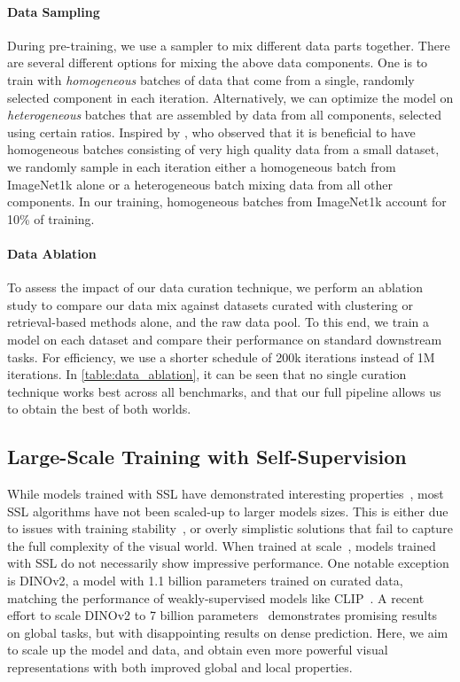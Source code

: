 \paragraph{Data Sampling}
During pre-training, we use a sampler to mix different data parts together.
There are several different options for mixing the above data components.
One is to train with \textit{homogeneous} batches of data that come from a single, randomly selected component in each iteration.
Alternatively, we can optimize the model on \textit{heterogeneous} batches that are assembled by data from all components, selected using certain ratios.
Inspired by \citet{charton2024emergent}, who observed that it is beneficial to have homogeneous batches consisting of very high quality data from a small dataset, we randomly sample in each iteration either a homogeneous batch from ImageNet1k alone or a heterogeneous batch mixing data from all other components.
In our training, homogeneous batches from ImageNet1k account for 10\% of training.

\paragraph{Data Ablation}
To assess the impact of our data curation technique, we perform an ablation study to compare our data mix against datasets curated with clustering or retrieval-based methods alone, and the raw data pool.
To this end, we train a model on each dataset and compare their performance on standard downstream tasks.
For efficiency, we use a shorter schedule of 200k iterations instead of 1M iterations.
In \cref{table:data_ablation}, it can be seen that no single curation technique works best across all benchmarks, and that our full pipeline allows us to obtain the best of both worlds.


\subsection{Large-Scale Training with Self-Supervision}
\label{sec:algo}
While models trained with SSL have demonstrated interesting properties~\citep{chen2020big,caron2021emerging}, most SSL algorithms have not been scaled-up to larger models sizes. %
This is either due to issues with training stability~\citep{darcet2025cluster}, or overly simplistic solutions that fail to capture the full complexity of the visual world. %
When trained at scale~\citep{goyal2022vision}, models trained with SSL do not necessarily show impressive performance. %
One notable exception is DINOv2, a model with 1.1 billion parameters trained on curated data, matching the performance of weakly-supervised models like CLIP~\citep{radford2021learning}. 
A recent effort to scale DINOv2 to 7 billion parameters~\citep{fan2025scaling} demonstrates promising results on global tasks, but with disappointing results on dense prediction.
Here, we aim to scale up the model and data, and obtain even more powerful visual representations with both improved global and local properties.



